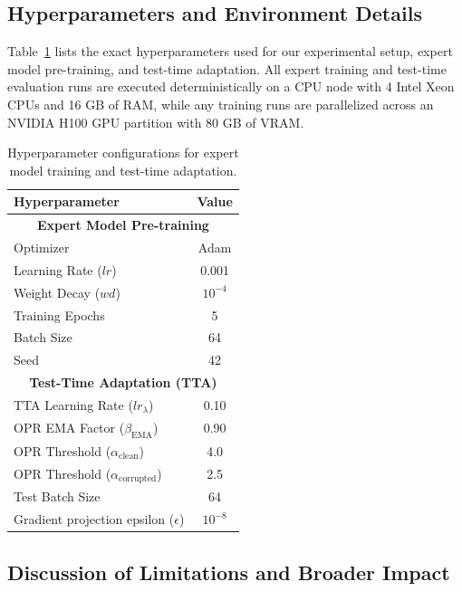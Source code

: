 \documentclass{article}
\theoremstyle{plain}
\theoremstyle{definition}
\theoremstyle{remark}
\begin{document}
\subsection{Hyperparameters and Environment Details}
Table~\ref{tab:hyperparams} lists the exact hyperparameters used for our experimental setup, expert model pre-training, and test-time adaptation. All expert training and test-time evaluation runs are executed deterministically on a CPU node with 4 Intel Xeon CPUs and 16 GB of RAM, while any training runs are parallelized across an NVIDIA H100 GPU partition with 80 GB of VRAM.

\begin{table}[H]
\caption{Hyperparameter configurations for expert model training and test-time adaptation.}
\label{tab:hyperparams}
\vskip 0.1in
\begin{center}
\begin{small}
\scshape
\begin{tabular}{lc}
\toprule
Hyperparameter & Value \\
\midrule
\multicolumn{2}{c}{\textbf{Expert Model Pre-training}} \\
\midrule
Optimizer & Adam \\
Learning Rate ($lr$) & 0.001 \\
Weight Decay ($wd$) & $10^{-4}$ \\
Training Epochs & 5 \\
Batch Size & 64 \\
Seed & 42 \\
\midrule
\multicolumn{2}{c}{\textbf{Test-Time Adaptation (TTA)}} \\
\midrule
TTA Learning Rate ($lr_\lambda$) & 0.10 \\
OPR EMA Factor ($\beta_{\text{EMA}}$) & 0.90 \\
OPR Threshold ($\alpha_{\text{clean}}$) & 4.0 \\
OPR Threshold ($\alpha_{\text{corrupted}}$) & 2.5 \\
Test Batch Size & 64 \\
Gradient projection epsilon ($\epsilon$) & $10^{-8}$ \\
\bottomrule
\end{tabular}
\end{small}
\end{center}
\vskip -0.1in
\end{table}

\subsection{Discussion of Limitations and Broader Impact}
\end{document}
